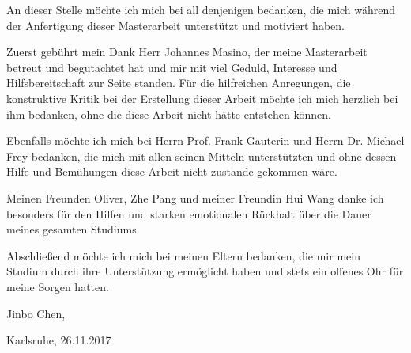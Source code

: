 

\thispagestyle{empty}


An dieser Stelle möchte ich mich bei all denjenigen bedanken, die mich während der Anfertigung dieser Masterarbeit unterstützt und motiviert haben.

Zuerst gebührt mein Dank Herr Johannes Masino, der meine Masterarbeit betreut und begutachtet hat und mir mit viel Geduld, Interesse und Hilfsbereitschaft zur Seite standen.
%
Für die hilfreichen Anregungen, die konstruktive Kritik bei der Erstellung dieser Arbeit möchte ich mich herzlich bei ihm bedanken, ohne die diese Arbeit nicht hätte entstehen können.

Ebenfalls möchte ich mich bei Herrn Prof. Frank Gauterin und Herrn Dr. Michael Frey bedanken, die mich mit allen seinen Mitteln unterstützten und ohne dessen Hilfe und Bemühungen diese Arbeit nicht zustande gekommen wäre.

Meinen Freunden Oliver, Zhe Pang und meiner Freundin Hui Wang danke ich besonders für den Hilfen und starken emotionalen Rückhalt über die Dauer meines gesamten Studiums.

Abschließend möchte ich mich bei meinen Eltern bedanken, die mir mein Studium durch ihre Unterstützung ermöglicht haben und stets ein offenes Ohr für meine Sorgen hatten.


Jinbo Chen,

Karlsruhe, 26.11.2017




